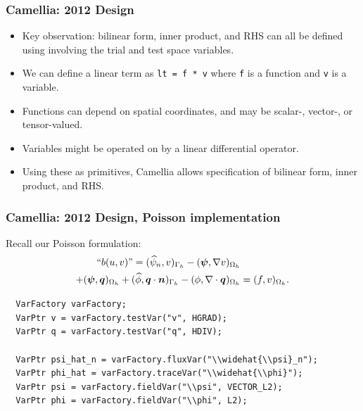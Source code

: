\documentclass[mathserif]{beamer}
\newcommand{\vect}[1]{\ensuremath\boldsymbol{#1}}
\newcommand{\code}[1]{\texttt{#1}}
\newcommand{\pecosbold}[1]{{\color{pecos2}{#1}}}
\begin{document}
\begin{frame}
\frametitle{Camellia: 2012 Design}
\begin{itemize}
\item Key observation: bilinear form, inner product, and RHS can all be defined using \pecosbold{linear terms} involving the trial and test space variables.
\item We can define a linear term as \code{lt = f * v} where \code{f} is a function and \code{v} is a variable.
\item Functions can depend on spatial coordinates, and may be scalar-, vector-, or tensor-valued.
\item Variables might be operated on by a linear differential operator.
\item Using these as primitives, Camellia allows \pecosbold{declarative} specification of bilinear form, inner product, and RHS.
\end{itemize}
\end{frame}

\begin{frame}[fragile]
\frametitle{Camellia: 2012 Design, Poisson implementation}
Recall our Poisson formulation:
\begin{align*}
\text{``}b(u,v)\text{''} = (\widehat{\psi}_n,v)_{\Gamma_h} - (\vect{\psi}, \nabla v)_{\Omega_h} &\\
+ (\vect{\psi}, \vect{q})_{\Omega_h} + (\widehat{\phi}, \vect{q}  \cdot \vect{n})_{\Gamma_h} - (\phi, \nabla \cdot \vect{q})_{\Omega_h} &= (f,v)_{\Omega_h}.
\end{align*}
\begin{lstlisting}
  VarFactory varFactory; 
  VarPtr v = varFactory.testVar("v", HGRAD);
  VarPtr q = varFactory.testVar("q", HDIV);
    
  VarPtr psi_hat_n = varFactory.fluxVar("\\widehat{\\psi}_n");
  VarPtr phi_hat = varFactory.traceVar("\\widehat{\\phi}");
  VarPtr psi = varFactory.fieldVar("\\psi", VECTOR_L2);
  VarPtr phi = varFactory.fieldVar("\\phi", L2);
\end{lstlisting}

\end{frame}
\end{document}
